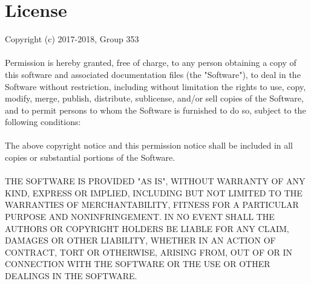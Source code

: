 \documentclass[ManualeSviluppatore.tex]{subfiles}
\begin{document}
\chapter{License}

\begin{ttfamily}
Copyright (c) 2017-2018, Group 353
\\ \\
Permission is hereby granted, free of charge, to any person obtaining a copy
of this software and associated documentation files (the "Software"), to deal
in the Software without restriction, including without limitation the rights
to use, copy, modify, merge, publish, distribute, sublicense, and/or sell
copies of the Software, and to permit persons to whom the Software is
furnished to do so, subject to the following conditions:
\\ \\
The above copyright notice and this permission notice shall be included in all
copies or substantial portions of the Software.
\\ \\
THE SOFTWARE IS PROVIDED "AS IS", WITHOUT WARRANTY OF ANY KIND, EXPRESS OR
IMPLIED, INCLUDING BUT NOT LIMITED TO THE WARRANTIES OF MERCHANTABILITY,
FITNESS FOR A PARTICULAR PURPOSE AND NONINFRINGEMENT. IN NO EVENT SHALL THE
AUTHORS OR COPYRIGHT HOLDERS BE LIABLE FOR ANY CLAIM, DAMAGES OR OTHER
LIABILITY, WHETHER IN AN ACTION OF CONTRACT, TORT OR OTHERWISE, ARISING FROM,
OUT OF OR IN CONNECTION WITH THE SOFTWARE OR THE USE OR OTHER DEALINGS IN THE
SOFTWARE.
\end{ttfamily}
\end{document}
